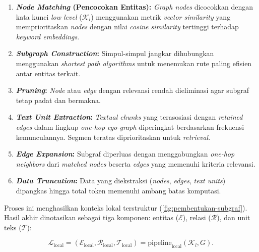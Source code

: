 \begin{enumerate}[label=\textbf{\arabic*.}, leftmargin=*, itemsep=10pt]
\begin{enumerate}[label=\textbf{\alph*.}, leftmargin=*, itemsep=5pt]
\begin{enumerate}[label=\textbf{\arabic*.}, leftmargin=*, itemsep=6pt]
                        \item \textbf{\textit{Node Matching} (Pencocokan Entitas):} \textit{Graph nodes} dicocokkan dengan kata kunci \textit{low level} ($\mathcal{K}_l$) menggunakan metrik \textit{vector similarity} yang memprioritaskan \textit{nodes} dengan nilai \textit{cosine similarity} tertinggi terhadap \textit{keyword embeddings}.

                        \item \textbf{\textit{Subgraph Construction}:} Simpul-simpul jangkar dihubungkan menggunakan \textit{shortest path algorithms} untuk menemukan rute paling efisien antar entitas terkait.

                        \item \textbf{\textit{Pruning}:} \textit{Node} atau \textit{edge} dengan relevansi rendah dieliminasi agar subgraf tetap padat dan bermakna.

                        \item \textbf{\textit{Text Unit Extraction}:} \textit{Textual chunks} yang terasosiasi dengan \textit{retained edges} dalam lingkup \textit{one-hop ego-graph} diperingkat berdasarkan frekuensi kemunculannya. Segmen teratas diprioritaskan untuk \textit{retrieval}.

                        \item \textbf{\textit{Edge Expansion}:} Subgraf diperluas dengan menggabungkan \textit{one-hop neighbors} dari \textit{matched nodes} beserta \textit{edges} yang memenuhi kriteria relevansi.

                        \item \textbf{\textit{Data Truncation}:} Data yang diekstraksi (\textit{nodes}, \textit{edges}, \textit{text units}) dipangkas hingga total token memenuhi ambang batas komputasi.

                    \end{enumerate}

                    \hspace*{0.75cm}Proses ini menghasilkan konteks lokal terstruktur (\ref{fig:pembentukan-subgraf}). Hasil akhir dinotasikan sebagai tiga komponen: entitas ($\mathcal{E}$), relasi ($\mathcal{R}$), dan unit teks ($\mathcal{T}$):

                    \begin{equation}
                        \mathcal{L}_{\text{local}} = (\mathcal{E}_{\text{local}}, \mathcal{R}_{\text{local}}, \mathcal{T}_{\text{local}})
                        = \text{pipeline}_{\text{local}}(\mathcal{K}_l, G).
                    \end{equation}


\end{enumerate}
\end{enumerate}
